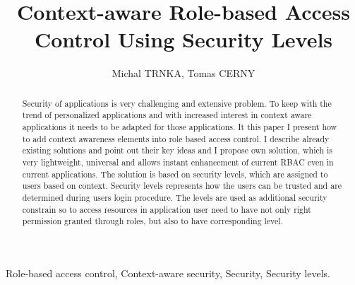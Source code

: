 \documentclass{poster15}
\begin{document}

%
\title{Context-aware Role-based Access Control Using Security Levels}
%

%
\author{Michal TRNKA, Tomas CERNY}
%


\maketitle


\begin{abstract}
Security of applications is very challenging and extensive problem. To keep with the trend of personalized applications and with increased interest in context aware applications it needs to be adapted for those applications. It this paper I present how to add context awareness elements into role based access control. I describe already existing solutions and point out their key ideas and I propose own solution, which is very lightweight, universal and allows instant enhancement of current RBAC even in current applications. The solution is based on security levels, which are assigned to users based on context. Security levels represents how the users can be trusted and are determined during users login procedure. The levels are used as additional security constrain so to access resources in application user need to have not only right permission granted through roles, but also to have corresponding level.
\end{abstract}


\begin{keywords}
Role-based access control, Context-aware security, Security, Security levels.
\end{keywords}
\end{document}
